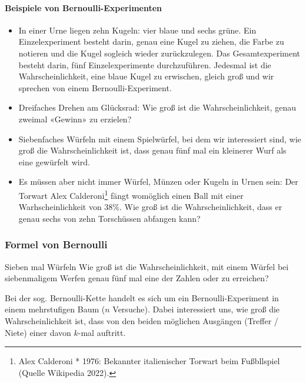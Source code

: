 \paragraph{Beispiele von Bernoulli-Experimenten}

\begin{itemize}
\item
In einer Urne liegen zehn Kugeln: vier blaue und sechs grüne. Ein
Einzelexperiment besteht darin, genau eine Kugel zu ziehen, die Farbe
zu notieren und die Kugel sogleich wieder zurückzulegen.
Das Gesamtexperiment besteht darin, fünf Einzelexperimente
durchzuführen. Jedesmal ist die Wahrscheinlichkeit, eine blaue Kugel
zu erwischen, gleich groß und wir sprechen von einem Bernoulli-Experiment.

\item Dreifaches Drehen am Glücksrad: Wie groß ist die Wahrscheinlichkeit, genau zweimal «Gewinn» zu erzielen?

\item Siebenfaches Würfeln mit einem Spielwürfel, bei dem wir
  interessiert sind, wie groß die Wahrscheinlichkeit ist, dass genau fünf mal ein kleinerer Wurf als eine  gewürfelt wird.
  
\item
Es müssen aber nicht immer Würfel, Münzen oder Kugeln in Urnen sein:
Der Torwart Alex Calderoni\footnote{Alex Calderoni * 1976: Bekannter
  italienischer Torwart beim Fußbllspiel (Quelle Wikipedia 2022).}
fängt womöglich einen Ball mit einer
Warhscheinlichkeit von 38\%.
Wie groß ist die Wahrscheinlichkeit, dass er genau sechs von zehn Torschüssen
abfangen kann?
\end{itemize}
\newpage


\subsubsection{Formel von Bernoulli}



\begin{beispiel}{Sieben mal Würfeln}{}
Wie groß ist die Wahrscheinlichkeit, mit einem Würfel bei
siebenmaligem Werfen genau fünf mal eine der Zahlen  oder
 zu erreichen?
\end{beispiel}

Bei der sog. Bernoulli-Kette handelt es sich um ein
Bernoulli-Experiment
in einem mehrstufigen Baum ($n$ Versuche). Dabei interessiert
uns, wie groß die Wahrscheinlichkeit ist, dass von den beiden
möglichen Ausgängen (Treffer / Niete) einer davon $k$-mal auftritt.

